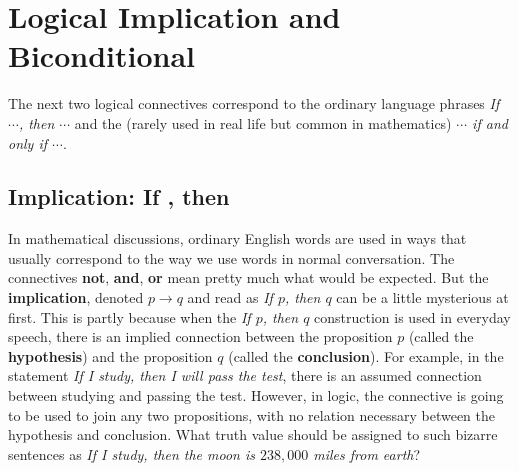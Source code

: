 \section{Logical Implication and Biconditional}

The next two logical connectives correspond to the ordinary language phrases {\itshape If $\cdots$, then $\cdots$}
and the (rarely used in real life but common in mathematics)  {\itshape $\cdots$ if and only if $\cdots$}.

\subsection{Implication: \textbf{If \textellipsis, then \textellipsis} }
In mathematical discussions, ordinary English words are used in ways
that usually correspond to the way we use words in normal conversation.
The connectives  {\bfseries not}, {\bfseries and}, \textbf{or}  mean pretty much what would be
expected.
But the {\bfseries implication}, denoted $p\to q$ and read as
{\itshape If $p$, then $q$} can be a little mysterious at first. This is partly because when the  {\itshape If $p$, then $q$}
construction is used in everyday speech, there is an implied connection between the proposition $p$ (called the {\bfseries hypothesis})
 and the proposition $q$ (called the {\bfseries conclusion}). For example, in the statement 
{\itshape If I study, then I will pass the test},
there is an assumed connection between studying and passing the test. However, in logic, the connective is going
to be used to join any two propositions, with no relation necessary between the hypothesis and conclusion. What truth value
should be assigned to such bizarre sentences as {\itshape If I study, then the moon is $238,000$ miles from earth}?  

